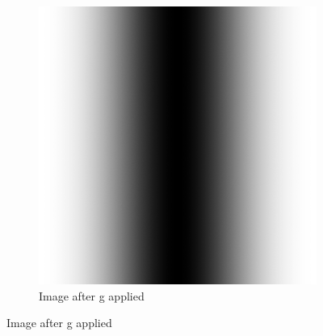 \documentclass[a4paper]{article}
\begin{document}
\begin{figure}[h!]
\begin{subfigure}[b]{0.3\textwidth}
                \includegraphics[width=\textwidth]{q3-afterim.png}
                \caption{Image after g applied}
                \label{fig:ai}
        \end{subfigure}
        

\end{figure}
\end{document}
